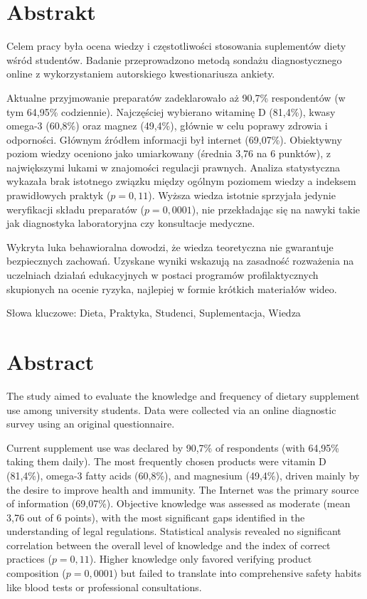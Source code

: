\section*{Abstrakt}\label{Abstrakt}

Celem pracy była ocena wiedzy i częstotliwości stosowania suplementów diety wśród studentów. Badanie przeprowadzono metodą sondażu diagnostycznego online z wykorzystaniem autorskiego kwestionariusza ankiety. 

Aktualne przyjmowanie preparatów zadeklarowało aż 90,7\% respondentów (w tym 64,95\% codziennie). Najczęściej wybierano witaminę D (81,4\%), kwasy omega-3 (60,8\%) oraz magnez (49,4\%), głównie w celu poprawy zdrowia i odporności. Głównym źródłem informacji był internet (69,07\%). Obiektywny poziom wiedzy oceniono jako umiarkowany (średnia 3,76 na 6 punktów), z największymi lukami w znajomości regulacji prawnych. Analiza statystyczna wykazała brak istotnego związku między ogólnym poziomem wiedzy a indeksem prawidłowych praktyk ($p = 0,11$). Wyższa wiedza istotnie sprzyjała jedynie weryfikacji składu preparatów ($p = 0,0001$), nie przekładając się na nawyki takie jak diagnostyka laboratoryjna czy konsultacje medyczne. 

Wykryta luka behawioralna dowodzi, że wiedza teoretyczna nie gwarantuje bezpiecznych zachowań. Uzyskane wyniki wskazują na zasadność rozważenia na uczelniach działań edukacyjnych w postaci programów profilaktycznych skupionych na ocenie ryzyka, najlepiej w formie krótkich materiałów wideo.

\bigskip

Słowa kluczowe: Dieta, Praktyka, Studenci, Suplementacja, Wiedza

\clearpage

\section*{Abstract}\label{Abstract}

The study aimed to evaluate the knowledge and frequency of dietary supplement use among university students. Data were collected via an online diagnostic survey using an original questionnaire.

Current supplement use was declared by 90,7\% of respondents (with 64,95\% taking them daily). The most frequently chosen products were vitamin D (81,4\%), omega-3 fatty acids (60,8\%), and magnesium (49,4\%), driven mainly by the desire to improve health and immunity. The Internet was the primary source of information (69,07\%). Objective knowledge was assessed as moderate (mean 3,76 out of 6 points), with the most significant gaps identified in the understanding of legal regulations. Statistical analysis revealed no significant correlation between the overall level of knowledge and the index of correct practices ($p = 0,11$). Higher knowledge only favored verifying product composition ($p = 0,0001$) but failed to translate into comprehensive safety habits like blood tests or professional consultations.

